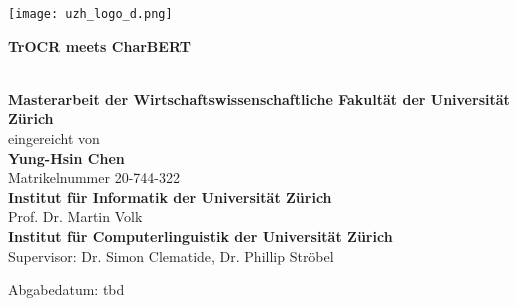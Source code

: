 \begin{titlepage}
\texttt{[image: uzh\_logo\_d.png]}\\ 

\begin{center}

\vspace{1.5cm}
\begin{Huge}\textbf{TrOCR meets CharBERT}\end{Huge}\\

\vspace{2cm}
\vfill {\Large \textbf{Masterarbeit der Wirtschaftswissenschaftliche Fakultät der Universität Zürich}} \\%
\Large eingereicht von\\	\Large\textbf{Yung-Hsin Chen} \\ 
Matrikelnummer 20-744-322 \\

\vspace{4cm}  
\vfill {\large \textbf{Institut für Informatik der Universität Zürich}\\Prof. Dr. Martin Volk\\
\large \textbf{Institut für Computerlinguistik der Universität Zürich}\\
Supervisor: Dr. Simon Clematide, Dr. Phillip Ströbel}

\vspace{1cm}

\vfill{\large Abgabedatum: tbd}
\vspace{3cm}
\end{center}

\end{titlepage}

\newpage
